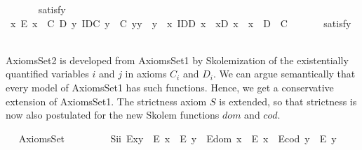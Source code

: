 \begin{isabellebody}
\ \ \ \ \ \isamarkupfalse%
\ {\isacharbrackleft}satisfy{\isacharbrackright}%
\isadelimproof
\ %
\endisadelimproof
%
\isatagproof
{}\isamarkupfalse%
\ %
%
\endisatagproof
{\isafoldproof}%
%
\isadelimproof
%
\endisadelimproof
\isanewline
\ \ \ \isamarkupfalse%
\ {\isachardoublequoteopen}{\isacharparenleft}{\isasymexists}x{\isachardot}\ E\ x{\isacharparenright}\ \isactrlbold {\isasymand}\ {\isacharparenleft}{\isasymexists}C\ D{\isachardot}\ {\isacharparenleft}\isactrlbold {\isasymforall}y{\isachardot}\ ID{\isacharparenleft}C\ y{\isacharparenright}\ \isactrlbold {\isasymand}\ {\isacharparenleft}C\ y{\isacharparenright}{\isasymcdot}y\ {\isasymcong}\ y{\isacharparenright}\ \isactrlbold {\isasymand}\ {\isacharparenleft}\isactrlbold {\isasymforall}x{\isachardot}\ ID{\isacharparenleft}D\ x{\isacharparenright}\ \isactrlbold {\isasymand}\ x{\isasymcdot}{\isacharparenleft}D\ x{\isacharparenright}\ {\isasymcong}\ x{\isacharparenright}\ \isactrlbold {\isasymand}\ \isactrlbold {\isasymnot}{\isacharparenleft}D\ \isactrlbold {\isacharequal}\ C{\isacharparenright}{\isacharparenright}{\isachardoublequoteclose}\isanewline
\ \ \ \ \ \isamarkupfalse%
\ {\isacharbrackleft}satisfy{\isacharbrackright}%
\isadelimproof
\ %
\endisadelimproof
%
\isatagproof
{}\isamarkupfalse%
\ %
%
\endisatagproof
{\isafoldproof}%
%
\isadelimproof
%
\endisadelimproof
\isanewline
\ \ \isamarkupfalse%
%
\isamarkuptrue%
%
\begin{isamarkuptext}%
AxiomsSet2 is developed from AxiomsSet1 by Skolemization of the
     existentially quantified variables $i$ and $j$ in axioms $C_i$ and
     $D_i$. We can argue semantically that every model of AxiomsSet1 has
     such functions. Hence, we get a conservative extension of AxiomsSet1. 
     The strictness axiom $S$ is extended, so
     that strictness is now also postulated for the new Skolem functions
     $dom$ and $cod$.%
\end{isamarkuptext}\isamarkuptrue%
\ \isamarkupfalse%
\ AxiomsSet{}\ {\isacharequal}\ \isanewline
\ \ \ \isanewline
\ \ \ S\isactrlsub i\isactrlsub i{\isacharcolon}\ {\isachardoublequoteopen}{\isacharparenleft}E{\isacharparenleft}x{\isasymcdot}y{\isacharparenright}\ \isactrlbold {\isasymrightarrow}\ {\isacharparenleft}E\ x\ \isactrlbold {\isasymand}\ E\ y{\isacharparenright}{\isacharparenright}\ \isactrlbold {\isasymand}\ {\isacharparenleft}E{\isacharparenleft}dom\ x{\isacharparenright}\ \isactrlbold {\isasymrightarrow}\ E\ x{\isacharparenright}\ \isactrlbold {\isasymand}\ {\isacharparenleft}E{\isacharparenleft}cod\ y{\isacharparenright}\ \isactrlbold {\isasymrightarrow}\ E\ y{\isacharparenright}{\isachardoublequoteclose}\ \ \isanewline

\end{isabellebody}
